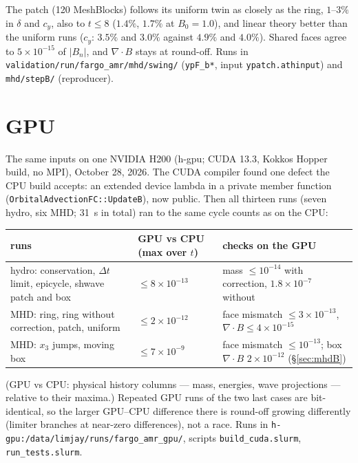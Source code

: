 \documentclass[11pt]{article}
\newcommand{\code}[1]{\texttt{#1}}
\newcommand{\file}[1]{\texttt{\small #1}}
\newcommand{\fn}[1]{\texttt{\small #1}}
\begin{document}
\noindent
The patch (120 MeshBlocks) follows its uniform twin as closely as the ring, $1$--$3\%$ in
$\delta$ and $c_y$, also to $t \le 8$ ($1.4\%$, $1.7\%$ at $B_0 = 1.0$), and linear theory
better than the uniform runs ($c_y$: $3.5\%$ and $3.0\%$ against $4.9\%$ and $4.0\%$). Shared
faces agree to $5\times10^{-15}$ of $|B_n|$, and $\nabla\!\cdot\!B$ stays at round-off. Runs in
\file{validation/run/fargo\_amr/mhd/swing/} (\code{ypF\_b*}, input \file{ypatch.athinput}) and
\file{mhd/stepB/} (reproducer).

\section{GPU}
\label{sec:gpu}
The same inputs on one NVIDIA H200 (h-gpu; CUDA 13.3, Kokkos Hopper build, no MPI), October
28, 2026. The CUDA compiler found one defect the CPU build accepts: an extended device
lambda in a private member function (\fn{OrbitalAdvectionFC::UpdateB}), now public. Then
all thirteen runs (seven hydro, six MHD; 31~s in total) ran to the same cycle counts as on
the CPU:

\begin{center}
\small
\begin{tabular}{@{}>{\raggedright\arraybackslash}p{5.4cm}>{\centering\arraybackslash}p{2.6cm}>{\raggedright\arraybackslash}p{6.0cm}@{}}
\toprule
runs & GPU vs CPU (max over $t$) & checks on the GPU \\
\midrule
hydro: conservation, $\Delta t$ limit, epicycle, shwave patch and box & $\le 8\times10^{-13}$ &
  mass $\le 10^{-14}$ with correction, $1.8\times10^{-7}$ without \\
MHD: ring, ring without correction, patch, uniform & $\le 2\times10^{-12}$ &
  face mismatch $\le 3\times10^{-13}$, $\nabla\!\cdot\!B \le 4\times10^{-15}$ \\
MHD: $x_3$ jumps, moving box & $\le 7\times10^{-9}$ &
  face mismatch $\le 10^{-13}$; box $\nabla\!\cdot\!B$ $2\times10^{-12}$ (\S\ref{sec:mhdB}) \\
\bottomrule
\end{tabular}
\end{center}

\noindent
(GPU vs CPU: physical history columns --- mass, energies, wave projections --- relative to
their maxima.) Repeated GPU runs of the two last cases are bit-identical, so the larger
GPU--CPU difference there is round-off growing differently (limiter branches at
near-zero differences), not a race. Runs in \file{h-gpu:/data/limjay/runs/fargo\_amr\_gpu/},
scripts \file{build\_cuda.slurm}, \file{run\_tests.slurm}.
\end{document}
